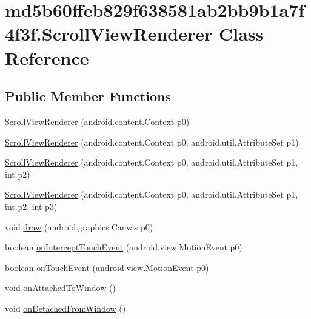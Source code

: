 \hypertarget{classmd5b60ffeb829f638581ab2bb9b1a7f4f3f_1_1_scroll_view_renderer}{
\section{md5b60ffeb829f638581ab2bb9b1a7f4f3f.ScrollViewRenderer Class Reference}
\label{classmd5b60ffeb829f638581ab2bb9b1a7f4f3f_1_1_scroll_view_renderer}
}
\subsection*{Public Member Functions}
\begin{CompactItemize}
\item 
\hyperlink{classmd5b60ffeb829f638581ab2bb9b1a7f4f3f_1_1_scroll_view_renderer_02512d520220cf6181e8a53806b72506}{ScrollViewRenderer} (android.content.Context p0)
\item 
\hyperlink{classmd5b60ffeb829f638581ab2bb9b1a7f4f3f_1_1_scroll_view_renderer_d686631aae6194ffcd34b7e3a9c0643d}{ScrollViewRenderer} (android.content.Context p0, android.util.AttributeSet p1)
\item 
\hyperlink{classmd5b60ffeb829f638581ab2bb9b1a7f4f3f_1_1_scroll_view_renderer_476765090c78d15df5e61c632e53be4f}{ScrollViewRenderer} (android.content.Context p0, android.util.AttributeSet p1, int p2)
\item 
\hyperlink{classmd5b60ffeb829f638581ab2bb9b1a7f4f3f_1_1_scroll_view_renderer_4e029c6c82f12c4db7e20a8ec6d888e9}{ScrollViewRenderer} (android.content.Context p0, android.util.AttributeSet p1, int p2, int p3)
\item 
void \hyperlink{classmd5b60ffeb829f638581ab2bb9b1a7f4f3f_1_1_scroll_view_renderer_ae3343e25e199d02c22d1e33b37138a3}{draw} (android.graphics.Canvas p0)
\item 
boolean \hyperlink{classmd5b60ffeb829f638581ab2bb9b1a7f4f3f_1_1_scroll_view_renderer_479edb806c389229f367e7fdf2c58ece}{onInterceptTouchEvent} (android.view.MotionEvent p0)
\item 
boolean \hyperlink{classmd5b60ffeb829f638581ab2bb9b1a7f4f3f_1_1_scroll_view_renderer_4581815eede4c1676de1f11fc07cb9c4}{onTouchEvent} (android.view.MotionEvent p0)
\item 
void \hyperlink{classmd5b60ffeb829f638581ab2bb9b1a7f4f3f_1_1_scroll_view_renderer_a4409732485b82d3c52bafb9a6b9a8e0}{onAttachedToWindow} ()
\item 
void \hyperlink{classmd5b60ffeb829f638581ab2bb9b1a7f4f3f_1_1_scroll_view_renderer_3f23bcefa3f1c0eb0cef347d894aac67}{onDetachedFromWindow} ()

\end{CompactItemize}
